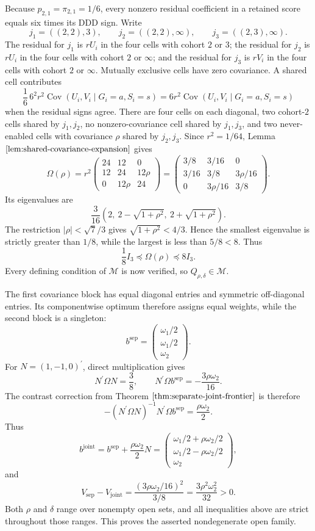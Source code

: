 Because \(p_{2,1}=\pi_{2,1}=1/6\), every nonzero residual coefficient in a retained score equals six times its DDD sign. Write
\[
 j_1=((2,2),3),\qquad
 j_2=((2,2),\infty),\qquad
 j_3=((2,3),\infty).
\]
The residual for \(j_1\) is \(rU_i\) in the four cells with cohort \(2\) or \(3\); the residual for \(j_2\) is \(rU_i\) in the four cells with cohort \(2\) or \(\infty\); and the residual for \(j_3\) is \(rV_i\) in the four cells with cohort \(2\) or \(\infty\). Mutually exclusive cells have zero covariance. A shared cell contributes
\[
 \frac16\,6^2r^2\operatorname{Cov}(U_i,V_i\mid G_i=a,S_i=s)
 =6r^2\operatorname{Cov}(U_i,V_i\mid G_i=a,S_i=s)
\]
when the residual signs agree. There are four cells on each diagonal, two cohort-\(2\) cells shared by \(j_1,j_2\), no nonzero-covariance cell shared by \(j_1,j_3\), and two never-enabled cells with covariance \(\rho\) shared by \(j_2,j_3\). Since \(r^2=1/64\), Lemma \(\ref{lem:shared-covariance-expansion}\) gives
\[
 \Omega(\rho)=r^2
 \begin{pmatrix}
 24&12&0\\
 12&24&12\rho\\
 0&12\rho&24
 \end{pmatrix}
 =
 \begin{pmatrix}
 3/8&3/16&0\\
 3/16&3/8&3\rho/16\\
 0&3\rho/16&3/8
 \end{pmatrix}.
\]
Its eigenvalues are
\[
 \frac3{16}\left(2,\ 2-\sqrt{1+\rho^2},\ 2+\sqrt{1+\rho^2}\right).
\]
The restriction \(|\rho|<\sqrt7/3\) gives \(\sqrt{1+\rho^2}<4/3\). Hence the smallest eigenvalue is strictly greater than \(1/8\), while the largest is less than \(5/8<8\). Thus
\[
 \frac18I_3\preceq\Omega(\rho)\preceq8I_3.
\]
Every defining condition of \(\mathcal M\) is now verified, so \(Q_{\rho,\delta}\in\mathcal M\).

The first covariance block has equal diagonal entries and symmetric off-diagonal entries. Its componentwise optimum therefore assigns equal weights, while the second block is a singleton:
\[
 b^{\mathrm{sep}}=
 \begin{pmatrix}\omega_1/2\\\omega_1/2\\\omega_2\end{pmatrix}.
\]
For \(N=(1,-1,0)^{\prime}\), direct multiplication gives
\[
 N^{\prime}\Omega N=\frac38,
 \qquad
 N^{\prime}\Omega b^{\mathrm{sep}}=-\frac{3\rho\omega_2}{16}.
\]
The contrast correction from Theorem \(\ref{thm:separate-joint-frontier}\) is therefore
\[
 -(N^{\prime}\Omega N)^{-1}N^{\prime}\Omega b^{\mathrm{sep}}
 =\frac{\rho\omega_2}{2}.
\]
Thus
\[
 b^{\mathrm{joint}}
 =b^{\mathrm{sep}}+\frac{\rho\omega_2}{2}N
 =\begin{pmatrix}
 \omega_1/2+\rho\omega_2/2\\
 \omega_1/2-\rho\omega_2/2\\
 \omega_2
 \end{pmatrix},
\]
and
\[
 V_{\mathrm{sep}}-V_{\mathrm{joint}}
 =\frac{(3\rho\omega_2/16)^2}{3/8}
 =\frac{3\rho^2\omega_2^2}{32}>0.
\]
Both \(\rho\) and \(\delta\) range over nonempty open sets, and all inequalities above are strict throughout those ranges. This proves the asserted nondegenerate open family.